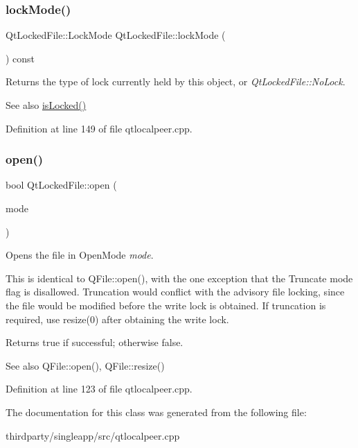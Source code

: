 \subsubsection{\texorpdfstring{lock\+Mode()}{lockMode()}}
{\footnotesize\ttfamily Qt\+Locked\+File\+::\+Lock\+Mode Qt\+Locked\+File\+::lock\+Mode (\begin{DoxyParamCaption}{ }\end{DoxyParamCaption}) const}

Returns the type of lock currently held by this object, or {\itshape Qt\+Locked\+File\+::\+No\+Lock}.

\begin{DoxySeeAlso}{See also}
\hyperlink{class_qt_l_p___private_1_1_qt_l_p___private_1_1_qt_locked_file_a0800b8ae9f4d268fe6968b9075f64bb3}{is\+Locked()} 
\end{DoxySeeAlso}


Definition at line 149 of file qtlocalpeer.\+cpp.

\mbox{\label{class_qt_l_p___private_1_1_qt_l_p___private_1_1_qt_locked_file_a2e81bbaa7b1aaa83cf79284e66dbad79}} 
\subsubsection{\texorpdfstring{open()}{open()}}
{\footnotesize\ttfamily bool Qt\+Locked\+File\+::open (\begin{DoxyParamCaption}\item[{Open\+Mode}]{mode }\end{DoxyParamCaption})}

Opens the file in Open\+Mode {\itshape mode}.

This is identical to Q\+File\+::open(), with the one exception that the Truncate mode flag is disallowed. Truncation would conflict with the advisory file locking, since the file would be modified before the write lock is obtained. If truncation is required, use resize(0) after obtaining the write lock.

Returns true if successful; otherwise false.

\begin{DoxySeeAlso}{See also}
Q\+File\+::open(), Q\+File\+::resize() 
\end{DoxySeeAlso}


Definition at line 123 of file qtlocalpeer.\+cpp.



The documentation for this class was generated from the following file\+:\begin{DoxyCompactItemize}
\item 
thirdparty/singleapp/src/qtlocalpeer.\+cpp\end{DoxyCompactItemize}
